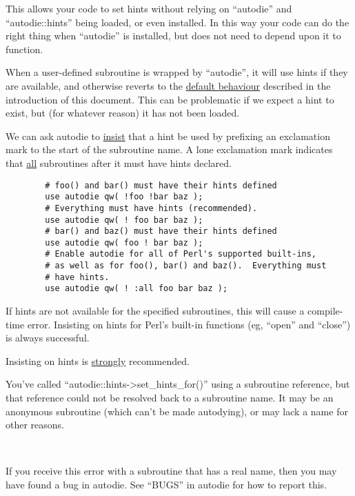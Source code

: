 \documentclass[]{article}
\renewcommand{\emph}[1]{\underline{#1}}
\begin{document}
This allows your code to set hints without relying on ``autodie'' and
``autodie::hints'' being loaded, or even installed. In this way your
code can do the right thing when ``autodie'' is installed, but does not
need to depend upon it to function.


When a user-defined subroutine is wrapped by ``autodie'', it will use
hints if they are available, and otherwise reverts to the \emph{default
behaviour} described in the introduction of this document. This can be
problematic if we expect a hint to exist, but (for whatever reason) it
has not been loaded.

We can ask autodie to \emph{insist} that a hint be used by prefixing an
exclamation mark to the start of the subroutine name. A lone exclamation
mark indicates that \emph{all} subroutines after it must have hints
declared.

\begin{verbatim}
        # foo() and bar() must have their hints defined
        use autodie qw( !foo !bar baz );
        # Everything must have hints (recommended).
        use autodie qw( ! foo bar baz );
        # bar() and baz() must have their hints defined
        use autodie qw( foo ! bar baz );
        # Enable autodie for all of Perl's supported built-ins,
        # as well as for foo(), bar() and baz().  Everything must
        # have hints.
        use autodie qw( ! :all foo bar baz );
\end{verbatim}

If hints are not available for the specified subroutines, this will
cause a compile-time error. Insisting on hints for Perl's built-in
functions (eg, ``open'' and ``close'') is always successful.

Insisting on hints is \emph{strongly} recommended.


\begin{description}
\itemsep1pt\parskip0pt
\item[Attempts to set\_hints\_for unidentifiable subroutine]
You've called ``autodie::hints-\textgreater{}set\_hints\_for()'' using a
subroutine reference, but that reference could not be resolved back to a
subroutine name. It may be an anonymous subroutine (which can't be made
autodying), or may lack a name for other reasons.

~

If you receive this error with a subroutine that has a real name, then
you may have found a bug in autodie. See ``BUGS'' in autodie for how to
report this.
\end{description}
\end{document}
